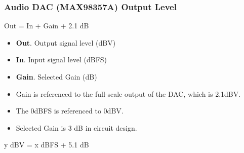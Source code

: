 \documentclass[table,dvipsnames]{beamer}
\begin{document}
	\begin{frame}[fragile]
		\frametitle{Audio DAC (MAX98357A) Output Level}
		
	\begin{exampleblock}{}
		\centering
		Out = In + Gain + 2.1 dB
	\end{exampleblock}

	\begin{exampleblock}{}
		\begin{itemize}
			\item \textbf{Out}. Output signal level (dBV)
			\item \textbf{In}. Input signal level (dBFS)
			\item \textbf{Gain}. Selected Gain (dB)
		\end{itemize}
	\end{exampleblock}

	\begin{exampleblock}{}
		\begin{itemize}
			\item Gain is referenced to the full-scale output of the DAC,
which is 2.1dBV.
			\item The 0dBFS is referenced to 0dBV.
			\item Selected Gain is 3 dB in circuit design.
		\end{itemize}
	\end{exampleblock}

	\begin{exampleblock}{}
		\centering
		y dBV = x dBFS + 5.1 dB
	\end{exampleblock}

	\end{frame}
\end{document}
